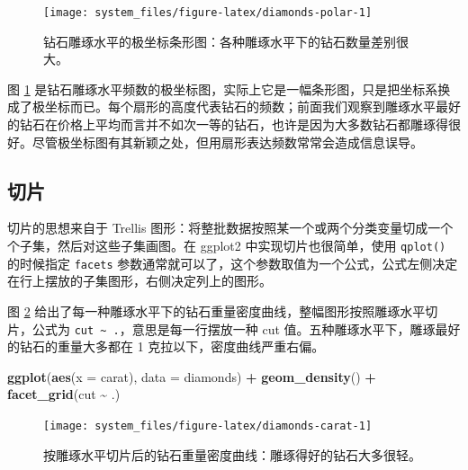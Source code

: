 \documentclass[
  b5paper,
  UTF8,twoside]{book}
\newenvironment{Shaded}{\begin{snugshade}}{\end{snugshade}}
\newcommand{\AttributeTok}[1]{\textcolor[rgb]{0.13,0.29,0.53}{#1}}
\newcommand{\FunctionTok}[1]{\textcolor[rgb]{0.13,0.29,0.53}{\textbf{#1}}}
\newcommand{\NormalTok}[1]{#1}
\newcommand{\SpecialCharTok}[1]{\textcolor[rgb]{0.81,0.36,0.00}{\textbf{#1}}}
\begin{document}
\begin{figure}

{\centering \texttt{[image: system\_files/figure-latex/diamonds-polar-1]} 

}

\caption[钻石雕琢水平的极坐标条形图]{钻石雕琢水平的极坐标条形图：各种雕琢水平下的钻石数量差别很大。}\label{fig:diamonds-polar}
\end{figure}





图 \ref{fig:diamonds-polar} 是钻石雕琢水平频数的极坐标图，实际上它是一幅条形图，只是把坐标系换成了极坐标而已。每个扇形的高度代表钻石的频数；前面我们观察到雕琢水平最好的钻石在价格上平均而言并不如次一等的钻石，也许是因为大多数钻石都雕琢得很好。尽管极坐标图有其新颖之处，但用扇形表达频数常常会造成信息误导。

\subsection{切片}\label{subsec:facet}

切片的思想来自于 Trellis 图形：将整批数据按照某一个或两个分类变量切成一个个子集，然后对这些子集画图。在 ggplot2 中实现切片也很简单，使用 \texttt{qplot()} 的时候指定 \texttt{facets} 参数通常就可以了，这个参数取值为一个公式，公式左侧决定在行上摆放的子集图形，右侧决定列上的图形。

图 \ref{fig:diamonds-carat} 给出了每一种雕琢水平下的钻石重量密度曲线，整幅图形按照雕琢水平切片，公式为 \texttt{cut\ \textasciitilde{}\ .}，意思是每一行摆放一种 cut 值。五种雕琢水平下，雕琢最好的钻石的重量大多都在 1 克拉以下，密度曲线严重右偏。

\begin{Shaded}
\begin{Highlighting}[]
\FunctionTok{ggplot}\NormalTok{(}\FunctionTok{aes}\NormalTok{(}\AttributeTok{x =}\NormalTok{ carat), }\AttributeTok{data =}\NormalTok{ diamonds) }\SpecialCharTok{+}
  \FunctionTok{geom\_density}\NormalTok{() }\SpecialCharTok{+}
  \FunctionTok{facet\_grid}\NormalTok{(cut }\SpecialCharTok{\textasciitilde{}}\NormalTok{ .)}
\end{Highlighting}
\end{Shaded}

\begin{figure}

{\centering \texttt{[image: system\_files/figure-latex/diamonds-carat-1]} 

}

\caption[按雕琢水平切片后的钻石重量密度曲线]{按雕琢水平切片后的钻石重量密度曲线：雕琢得好的钻石大多很轻。}\label{fig:diamonds-carat}
\end{figure}
\end{document}
